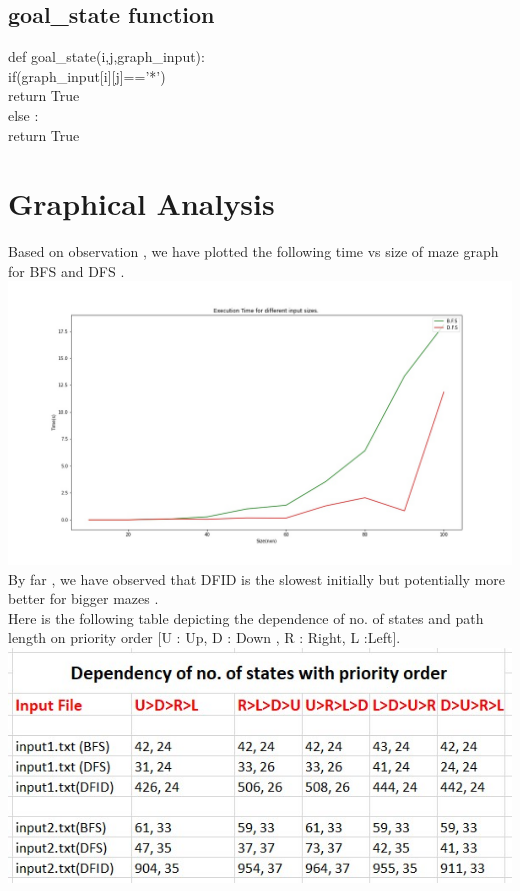 \documentclass{article}
\begin{document}
\subsection*{goal\_state function}
    \vspace{5pt}
    def goal\_state(i,j,graph\_input):
    \vspace{5pt}
        \\ \hspace*{20pt}if(graph\_input[i][j]=='*')
        \vspace{5pt}
        \\ \hspace*{30pt} return True
        \vspace{2pt}
        \\ \hspace*{20pt}else :
        \vspace{5pt}
        \\ \hspace*{30pt} return True
\newpage
\section{Graphical Analysis}
\vspace{5pt}
Based on observation , we have plotted the following time vs size of maze graph for BFS and DFS .
\vspace{20pt}
\\\includegraphics[scale=0.3]{time.jpg}
\\By far , we have observed that DFID is the slowest initially but potentially more better for bigger mazes .
\vspace{20pt}
\\Here is the following table depicting the dependence of no. of states and path length on priority order [U : Up, D : Down , R : Right, L :Left].
\vspace{10pt}
\\\includegraphics{table.jpg}
\newpage
\end{document}
